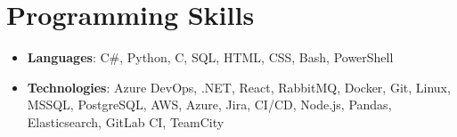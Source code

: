 \documentclass[letterpaper,11pt]{article}
\newcommand{\resumeSubHeadingListStart}{\begin{itemize}[leftmargin=*]}
\newcommand{\resumeSubHeadingListEnd}{\end{itemize}}
\begin{document}
%
\section{Programming Skills}
\resumeSubHeadingListStart
\item{
            \textbf{Languages}{: C\#, Python, C, SQL, HTML, CSS, Bash, PowerShell}
      }
\item{
            \textbf{Technologies}{: Azure DevOps, .NET, React, RabbitMQ, Docker, Git, Linux, MSSQL, PostgreSQL, AWS, Azure, Jira, CI/CD, Node.js, Pandas, Elasticsearch, GitLab CI, TeamCity}
      }
\resumeSubHeadingListEnd


\end{document}
